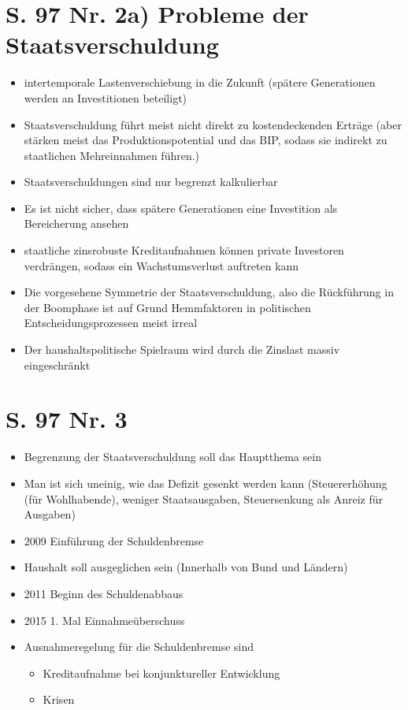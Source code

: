 \documentclass[12pt,a4paper]{report}
\begin{document}
	\section{S. 97 Nr. 2a) Probleme der Staatsverschuldung}
	\begin{itemize}
		\item intertemporale Lastenverschiebung in die Zukunft (spätere Generationen werden an Investitionen beteiligt)
		\item Staatsverschuldung führt meist nicht direkt zu kostendeckenden Erträge (aber stärken meist das Produktionspotential und das BIP, sodass sie indirekt zu staatlichen Mehreinnahmen führen.)
		\item Staatsverschuldungen sind nur begrenzt kalkulierbar
		\item Es ist nicht sicher, dass spätere Generationen eine Investition als Bereicherung ansehen
		\item staatliche zinsrobuste Kreditaufnahmen können private Investoren verdrängen, sodass ein Wachstumsverlust auftreten kann
		\item Die vorgesehene Symmetrie der Staatsverschuldung, also die Rückführung in der Boomphase ist auf Grund Hemmfaktoren in politischen Entscheidungsprozessen meist irreal
		\item Der haushaltspolitische Spielraum wird durch die Zinslast massiv eingeschränkt
	\end{itemize}
	\section{S. 97 Nr. 3}
	\begin{itemize}
		\item Begrenzung der Staatsverschuldung soll das Hauptthema sein
		\item Man ist sich uneinig, wie das Defizit gesenkt werden kann (Steuererhöhung (für Wohlhabende), weniger Staatsausgaben, Steuersenkung als Anreiz für Ausgaben)
		\item 2009 Einführung der Schuldenbremse
		\item Haushalt soll ausgeglichen sein (Innerhalb von Bund und Ländern)
		\item 2011 Beginn des Schuldenabbaus
		\item 2015 1. Mal Einnahmeüberschuss
		\item Ausnahmeregelung für die Schuldenbremse sind
		\begin{itemize}
			\item Kreditaufnahme bei konjunktureller Entwicklung
			\item Krisen
		\end{itemize}
	\end{itemize}
\end{document}
